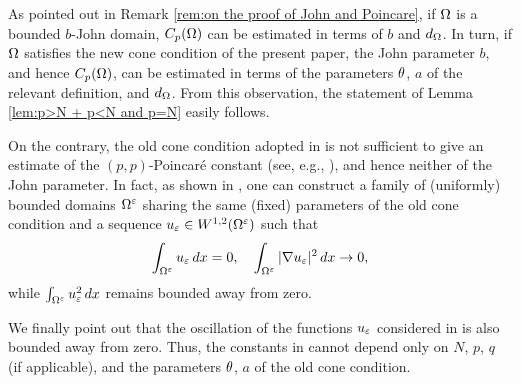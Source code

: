 \documentclass[a4paper,10pt]{amsart}
\numberwithin{equation}{section}
\begin{document}
\begin{rem}
 {\rm
As pointed out in Remark \ref{rem:on the proof of John and Poincare},
%
%
if $\Omega$ is a bounded $b$-John domain, $C_p(\Omega)$ can be estimated in terms of $b$ and $d_\Omega$. In turn, if $\Omega$ satisfies the new cone condition of the present paper, the John parameter $b$, and hence $C_p(\Omega)$, can be estimated in terms of the parameters $\theta$, $a$ of the relevant definition, and $d_\Omega$. From this observation, the statement of Lemma \ref{lem:p>N + p<N and p=N} easily follows.
\par
On the contrary, the old cone condition adopted in \cite{MP6} is not sufficient to give an estimate of the $(p,p)$-Poincar\'e constant (see, e.g., \cite{Ru}), and hence neither of the John parameter. 
In fact, as shown in \cite[Example 2.6]{Ru}, one can construct a family of (uniformly) bounded domains $\Omega^\varepsilon$ sharing the same (fixed) parameters of the old cone condition and a sequence $u_\varepsilon \in W^{1,2}(\Omega^\varepsilon)$ such that
$$
\int_{\Omega^\varepsilon} u_\varepsilon \, dx = 0, \quad \int_{\Omega^\varepsilon}|\nabla u_\varepsilon|^2 \, dx \to 0,
$$
while
$\int_{\Omega^\varepsilon} u_\varepsilon^2 \, dx$ remains bounded away from zero.
\par
We finally point out that the oscillation of the functions $u_\varepsilon$ considered in \cite[Example 2.6]{Ru} is also bounded away from zero.
Thus, the constants in \cite[Corollary 2.3 and Theorems 2.4 and 2.7]{MP6} cannot depend only on $N$, $p$, $q$ (if applicable),
and the parameters $\theta$, $a$ of the old cone condition.
}
\end{rem}
\end{document}
